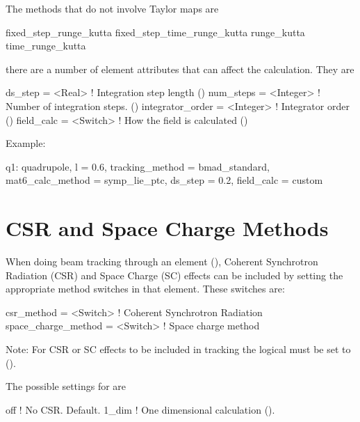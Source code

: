The methods that do not involve Taylor maps are
\begin{example}
  fixed_step_runge_kutta
  fixed_step_time_runge_kutta
  runge_kutta
  time_runge_kutta
\end{example}

there are a number of element attributes that can affect the calculation. They are
\begin{example}
  ds_step             = <Real>     ! Integration step length ()
  num_steps           = <Integer>  ! Number of integration steps. ()
  integrator_order    = <Integer>  ! Integrator order ()
  field_calc          = <Switch>   ! How the field is calculated ()
\end{example}

Example:
\begin{example}
  q1: quadrupole, l = 0.6, tracking_method = bmad_standard, 
        mat6_calc_method = symp_lie_ptc, ds_step = 0.2, field_calc = custom
\end{example}

\section{CSR and Space Charge Methods}
\label{s:csr.sc.meth}

When doing beam tracking through an element (), Coherent Synchrotron Radiation (CSR) and Space Charge (SC)
effects can be included by setting the appropriate method switches in that element. These switches are:
\begin{example}
  csr_method          = <Switch>   ! Coherent Synchrotron Radiation 
  space_charge_method = <Switch>   ! Space charge method
\end{example}
Note: For CSR or SC effects to be included in tracking the  logical  must be
set to  (). 

The possible settings for  are
\begin{example}
  off             ! No CSR. Default.
  1_dim           ! One dimensional calculation ().
\end{example}

